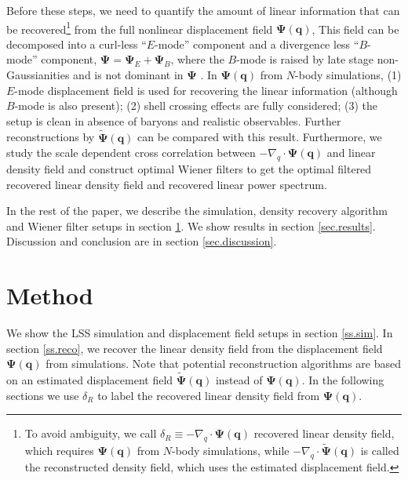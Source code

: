 \documentclass[aps,prd,twocolumn,superscriptaddress,amsfont,amssymb,amsmath,nofootinbib,showpacs,balancelastpage]{revtex4-1}
\newcommand{\bs}{\boldsymbol}
\begin{document}
Before these steps, we need to quantify the amount of linear information
that can be recovered\footnote{To avoid ambiguity, we call
$\delta_R\equiv-\nabla_q\cdot\bs\Psi(\bs q)$ recovered linear density field, which
requires $\bs\Psi(\bs q)$ from $N$-body simulations, while
$-\nabla_q\cdot\tilde{\bs \Psi}(\bs q)$ is called the
reconstructed density field, which uses the estimated displacement field.}
from the full nonlinear displacement field $\bs\Psi(\bs q)$,
This field can be decomposed into a curl-less ``$E$-mode'' component
and a divergence less ``$B$-mode'' component, $\bs\Psi=\bs\Psi_E+\bs\Psi_B$,
where the $B$-mode is raised by late stage non-Gaussianities and is not
dominant in $\bs\Psi$ \citep{2014PhRvD..89h3515C}.
In $\bs\Psi(\bs q)$ from $N$-body simulations,
(1) $E$-mode displacement field is used for recovering the linear information
(although $B$-mode is also present); (2) shell crossing effects are fully considered;
(3) the setup is clean in absence of baryons and realistic
observables. Further reconstructions by $\tilde{\bs \Psi}(\bs q)$
can be compared with this result.
Furthermore, we study the scale dependent cross correlation
between $-\nabla_q\cdot\bs\Psi(\bs q)$ and linear density field
and construct optimal Wiener filters to get the optimal filtered
recovered linear density field and recovered linear power spectrum.

In the rest of the paper, we describe the simulation,
density recovery algorithm and Wiener filter setups in section
\ref{sec.method}. We show results in section \ref{sec.results}.
Discussion and conclusion are in section \ref{sec.discussion}.


\section{Method}\label{sec.method}
We show the LSS simulation and displacement field setups in section \ref{ss.sim}.
In section \ref{ss.reco}, we recover the linear density field from the
displacement field $\bs\Psi(\bs q)$ from simulations.
Note that potential reconstruction algorithms are
based on an estimated displacement field $\tilde{\bs \Psi}(\bs q)$
instead of $\bs\Psi(\bs q)$. In the following sections we
use $\delta_R$ to label the recovered linear density field
from $\bs\Psi(\bs q)$.
\end{document}
